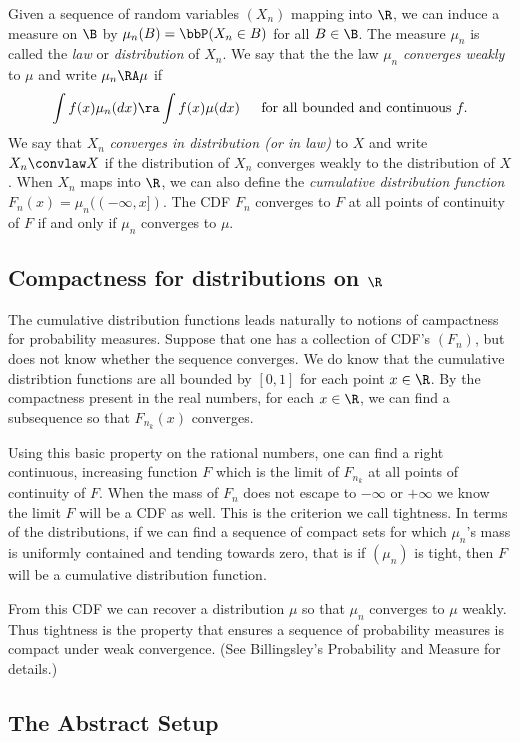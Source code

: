 \documentclass{report}
\begin{document}
Given a sequence of random variables $(X_n)$ mapping into $\R$, we can
induce a measure on $\B$ by $\mu_n(B) = \bbP(X_n \in B)$ for all $B
\in \B$.  The measure $\mu_n$ is called the \emph{law} or
\emph{distribution} of $X_n$.  We say that the the law $\mu_n$
\emph{converges weakly} to $\mu$ and write $\mu_n \RA \mu$ if
\[
\int f(x) \mu_n(dx) \ra \int f(x) \mu(dx) \hspace{12pt} \textmd{ for
all bounded and continuous } f. 
\]
We say that $X_n$ \emph{converges in distribution (or in law)} to $X$
and write $X_n \convlaw X$ if the distribution of $X_n$ converges
weakly to the distribution of $X$.  When $X_n$ maps into $\R$, we can
also define the \emph{cumulative distribution function} $F_n(x) =
\mu_n( (-\infty,x])$.  The CDF $F_n$ converges to $F$ at all points of
continuity of $F$ if and only if $\mu_n$ converges to $\mu$.

\subsection{Compactness for distributions on $\R$}

The cumulative distribution functions leads naturally to notions of
campactness for probability measures.  Suppose that one has a
collection of CDF's $(F_n)$, but does not know whether the sequence
converges.  We do know that the cumulative distribtion functions are
all bounded by $[0,1]$ for each point $x \in \R$.  By the compactness
present in the real numbers, for each $x \in \R$, we can find a
subsequence so that $F_{n_k}(x)$ converges.  

Using this basic property on the rational numbers, one can find a
right continuous, increasing function $F$ which is the limit of
$F_{n_k}$ at all points of continuity of $F$.  When the mass of $F_n$
does not escape to $-\infty$ or $+\infty$ we know the limit $F$ will
be a CDF as well.  This is the criterion we call tightness.  In terms
of the distributions, if we can find a sequence of compact sets for
which $\mu_n$'s mass is uniformly contained and tending towards zero,
that is if $(\mu_n)$ is tight, then $F$ will be a cumulative
distribution function.  

From this CDF we can recover a distribution $\mu$ so that $\mu_n$
converges to $\mu$ weakly.  Thus tightness is the property that
ensures a sequence of probability measures is compact under weak
convergence.  (See Billingsley's Probability and Measure for details.)

\subsection{The Abstract Setup}
\end{document}
